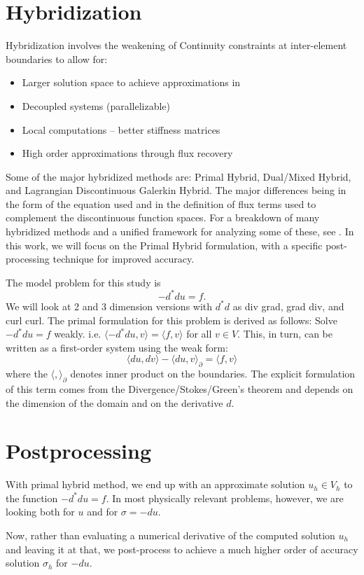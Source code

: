 \documentclass{article}
\begin{document}
\section{Hybridization}
Hybridization involves the weakening of Continuity 
constraints at inter-element boundaries to allow for: 
\begin{itemize}
\item Larger solution space to achieve approximations in
\item Decoupled systems (parallelizable)
\item Local computations -- better stiffness matrices
\item High order approximations through flux recovery
\end{itemize}
Some of the major hybridized methods are: 
Primal Hybrid, 
Dual/Mixed Hybrid, and 
Lagrangian Discontinuous Galerkin Hybrid. The major differences being in 
the form of the equation used and in the definition of flux terms 
used to complement the discontinuous function spaces. 
For a breakdown of many hybridized methods and a unified framework 
for analyzing some of these, see \cite{abcm012,cgl16}. 
In this work, we will focus on the Primal Hybrid formulation, with a 
specific post-processing technique for improved accuracy. 

The model problem for this study is $$-d^*du=f.$$ We will look at 
2 and 3 dimension versions with $d^*d$ as div grad, grad div, and curl curl. 
The primal formulation for this problem is derived as follows: 
Solve $-d^*du=f$ weakly. i.e. $\langle-d^*du,v\rangle=\langle f,v\rangle$ 
for all $v\in V$. This, in turn, can be written as a first-order system 
using the weak form:
$$
\langle du,dv\rangle-\langle du, v\rangle_\partial=\langle f,v\rangle
$$
where the $\langle,\rangle_\partial$ denotes inner product on the 
boundaries. The explicit formulation of this term comes from the 
Divergence/Stokes/Green's theorem and depends
on the dimension of the domain and on the derivative $d$. 

\section{Postprocessing}
With primal hybrid method, we end up with an approximate 
solution $u_h\in V_h$ to the function $-d^*du=f$. 
In most physically relevant problems, however, we are looking both for $u$ and for 
$\sigma=-du$. 

Now, rather than evaluating a numerical derivative of the 
computed solution $u_h$ and leaving it at that, we post-process to achieve 
a much higher order of accuracy solution $\sigma_h$ for $-du$. 
\end{document}
